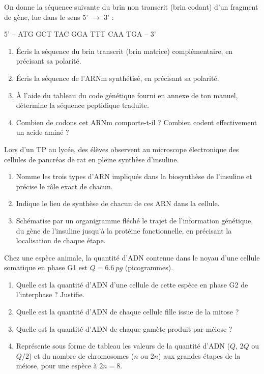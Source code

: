 \documentclass[11pt]{article}
\newcounter{popsec}
\newcounter{popsub}
\newcommand{\courssub}[1]{%
  \stepcounter{popsub}%
  \par\vspace{9pt}\noindent{\popxbold\fontsize{11.5}{13}\selectfont\color{popink}{\color{poporange}\thepopsec.\thepopsub}\hspace{6pt}#1}\par\nopagebreak\vspace{4pt}
}
\begin{document}
\courssub{Je m'entraîne}

\begin{exercice}
On donne la séquence suivante du brin non transcrit (brin codant) d'un fragment de gène, lue dans le sens 5' $\rightarrow$ 3' :
\begin{center}
5' -- ATG GCT TAC GGA TTT CAA TGA -- 3'
\end{center}
\begin{enumerate}
\item Écris la séquence du brin transcrit (brin matrice) complémentaire, en précisant sa polarité.
\item Écris la séquence de l'ARNm synthétisé, en précisant sa polarité.
\item À l'aide du tableau du code génétique fourni en annexe de ton manuel, détermine la séquence peptidique traduite.
\item Combien de codons cet ARNm comporte-t-il ? Combien codent effectivement un acide aminé ?
\end{enumerate}
\end{exercice}

\begin{exercice}
Lors d'un TP au lycée, des élèves observent au microscope électronique des cellules de pancréas de rat en pleine synthèse d'insuline.
\begin{enumerate}
\item Nomme les trois types d'ARN impliqués dans la biosynthèse de l'insuline et précise le rôle exact de chacun.
\item Indique le lieu de synthèse de chacun de ces ARN dans la cellule.
\item Schématise par un organigramme fléché le trajet de l'information génétique, du gène de l'insuline jusqu'à la protéine fonctionnelle, en précisant la localisation de chaque étape.
\end{enumerate}
\end{exercice}

\begin{exercice}
Chez une espèce animale, la quantité d'ADN contenue dans le noyau d'une cellule somatique en phase G1 est $Q = \SI{6,6}{pg}$ (picogrammes).
\begin{enumerate}
\item Quelle est la quantité d'ADN d'une cellule de cette espèce en phase G2 de l'interphase ? Justifie.
\item Quelle est la quantité d'ADN de chaque cellule fille issue de la mitose ?
\item Quelle est la quantité d'ADN de chaque gamète produit par méiose ?
\item Représente sous forme de tableau les valeurs de la quantité d'ADN ($Q$, $2Q$ ou $Q/2$) et du nombre de chromosomes ($n$ ou $2n$) aux grandes étapes de la méiose, pour une espèce à $2n = 8$.
\end{enumerate}
\end{exercice}
\end{document}
